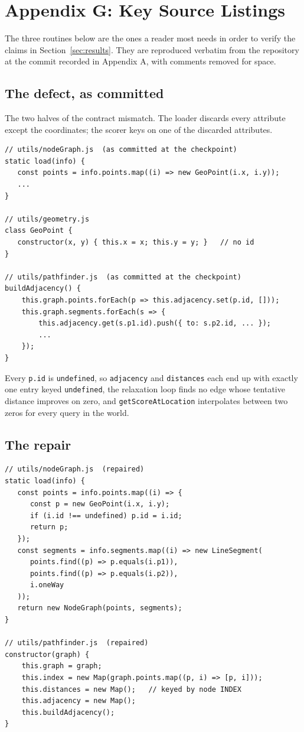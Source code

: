\documentclass[conference]{IEEEtran}
\begin{document}
\section*{Appendix G: Key Source Listings}

\label{sec:appG}

The three routines below are the ones a reader most needs in order to verify the claims in Section~\ref{sec:results}. They are reproduced verbatim from the repository at the commit recorded in Appendix A, with comments removed for space.

\subsection{The defect, as committed}

The two halves of the contract mismatch. The loader discards every attribute except the coordinates; the scorer keys on one of the discarded attributes.

\begin{verbatim}
// utils/nodeGraph.js  (as committed at the checkpoint)
static load(info) {
   const points = info.points.map((i) => new GeoPoint(i.x, i.y));
   ...
}

// utils/geometry.js
class GeoPoint {
   constructor(x, y) { this.x = x; this.y = y; }   // no id
}

// utils/pathfinder.js  (as committed at the checkpoint)
buildAdjacency() {
    this.graph.points.forEach(p => this.adjacency.set(p.id, []));
    this.graph.segments.forEach(s => {
        this.adjacency.get(s.p1.id).push({ to: s.p2.id, ... });
        ...
    });
}
\end{verbatim}

Every \texttt{p.id} is \texttt{undefined}, so \texttt{adjacency} and \texttt{distances} each end up with exactly one entry keyed \texttt{undefined}, the relaxation loop finds no edge whose tentative distance improves on zero, and \texttt{getScoreAtLocation} interpolates between two zeros for every query in the world.

\subsection{The repair}

\begin{verbatim}
// utils/nodeGraph.js  (repaired)
static load(info) {
   const points = info.points.map((i) => {
      const p = new GeoPoint(i.x, i.y);
      if (i.id !== undefined) p.id = i.id;
      return p;
   });
   const segments = info.segments.map((i) => new LineSegment(
      points.find((p) => p.equals(i.p1)),
      points.find((p) => p.equals(i.p2)),
      i.oneWay
   ));
   return new NodeGraph(points, segments);
}

// utils/pathfinder.js  (repaired)
constructor(graph) {
    this.graph = graph;
    this.index = new Map(graph.points.map((p, i) => [p, i]));
    this.distances = new Map();   // keyed by node INDEX
    this.adjacency = new Map();
    this.buildAdjacency();
}
\end{verbatim}
\end{document}
